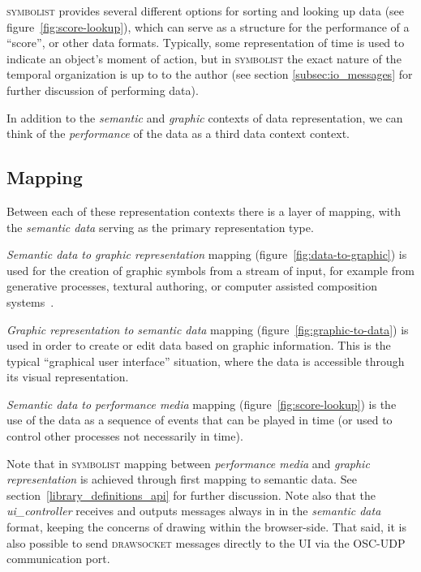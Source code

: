 \documentclass{article}
\def\symbolist{\textsc{symbolist}\xspace}
\def\drawsocket{\textsc{drawsocket}\xspace}
\begin{document}
\symbolist provides several different options for sorting and looking up data (see figure~\ref{fig:score-lookup}), which can serve as a structure for the performance of a ``score'', or other data formats. Typically, some representation of time is used to indicate an object's moment of action, but in \symbolist the exact nature of the temporal organization is up to to the author (see section \ref{subsec:io_messages} for further discussion of performing data). 

In addition to the \textit{semantic} and \textit{graphic} contexts of data representation, we can think of the \textit{performance} of the data as a third data context context.

\subsection{Mapping}\label{subsec:mapping}

Between each of these representation contexts there is a layer of mapping, with the \textit{semantic data} serving as the primary representation type. 

\textit{Semantic data to graphic representation} mapping (figure~\ref{fig:data-to-graphic}) is used for the creation of graphic symbols from a stream of input, for example from generative processes, textural authoring, or computer assisted composition systems~\cite{bresson2011om, didkovsky2008maxscore, agostini2015max, baca2015abjad, burloiu2017visual}.

\textit{Graphic representation to semantic data} mapping (figure~\ref{fig:graphic-to-data}) is used in order to create or edit data based on graphic information. This is the typical ``graphical user interface'' situation, where the data is accessible through its visual representation.

\textit{Semantic data to performance media} mapping (figure~\ref{fig:score-lookup}) is the use of the data as a sequence of events that can be played in time (or used to control other processes not necessarily in time).

Note that in \symbolist mapping between \textit{performance media} and \textit{graphic representation} is achieved through first mapping to semantic data. See section~\ref{library_definitions_api} for further discussion.
Note also that the \textit{ui\_controller} receives and outputs messages always in in the \textit{semantic data} format, keeping the concerns of drawing within the browser-side. That said, it is also possible to send \drawsocket messages directly to the UI via the OSC-UDP communication port.
\end{document}
